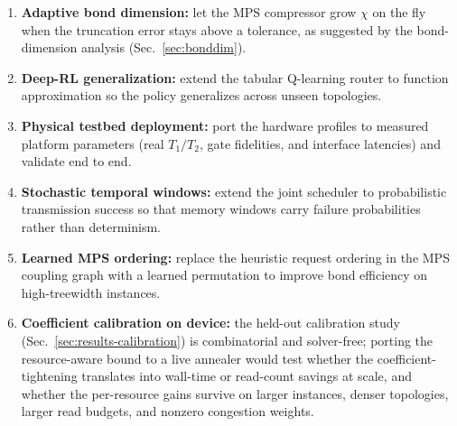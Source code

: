 \documentclass[10pt,a4paper]{article}
\begin{document}
\begin{enumerate}
  \item \textbf{Adaptive bond dimension:} let the MPS compressor grow
    $\chi$ on the fly when the truncation error stays above a
    tolerance, as suggested by the bond-dimension analysis
    (Sec.~\ref{sec:bonddim}).
  \item \textbf{Deep-RL generalization:} extend the tabular
    Q-learning router to function approximation so the policy
    generalizes across unseen topologies.
  \item \textbf{Physical testbed deployment:} port the hardware
    profiles to measured platform parameters (real $T_1/T_2$,
    gate fidelities, and interface latencies) and validate end to end.
  \item \textbf{Stochastic temporal windows:} extend the joint
    scheduler to probabilistic transmission success so that memory
    windows carry failure probabilities rather than determinism.
  \item \textbf{Learned MPS ordering:} replace the heuristic request
    ordering in the MPS coupling graph with a learned permutation to
    improve bond efficiency on high-treewidth instances.
  \item \textbf{Coefficient calibration on device:} the held-out
    calibration study (Sec.~\ref{sec:results-calibration}) is
    combinatorial and solver-free; porting the resource-aware bound to
    a live annealer would test whether the coefficient-tightening
    translates into wall-time or read-count savings at scale, and
    whether the per-resource gains survive on larger instances, denser
    topologies, larger read budgets, and nonzero congestion weights.
\end{enumerate}
\end{document}
